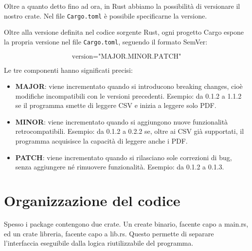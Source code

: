 
Oltre a quanto detto fino ad ora, in Rust abbiamo la possibilità di versionare
il nostro crate. Nel file \texttt{Cargo.toml} è possibile specificarne la versione.

Oltre alla versione definita nel codice sorgente Rust, ogni progetto Cargo
espone la propria versione nel file \texttt{Cargo.toml}, seguendo il formato SemVer:

\begin{center}
  \begin{equation*}
    \text{version} = \text{"MAJOR.MINOR.PATCH"}
  \end{equation*}
\end{center}


Le tre componenti hanno significati precisi:

\begin{itemize}
  \item \textbf{MAJOR}: viene incrementato quando si introducono breaking
        changes, cioè modifiche incompatibili con le versioni precedenti. Esempio: da
        0.1.2 a 1.1.2 se il programma smette di leggere CSV e inizia a leggere solo
        PDF.
  \item \textbf{MINOR}: viene incrementato quando si aggiungono nuove
        funzionalità retrocompatibili. Esempio: da 0.1.2 a 0.2.2 se, oltre ai CSV già
        supportati, il programma acquisisce la capacità di leggere anche i PDF.
  \item \textbf{PATCH}: viene incrementato quando si rilasciano sole correzioni
        di bug, senza aggiungere né rimuovere funzionalità. Esempio: da 0.1.2 a 0.1.3.
\end{itemize}

\section{Organizzazione del codice}

Spesso i package contengono due crate. Un create binario, facente capo a main.rs,
ed un crate libreria, facente capo a lib.rs. Questo permette di separare
l'interfaccia eseguibile dalla logica riutilizzabile del programma.

